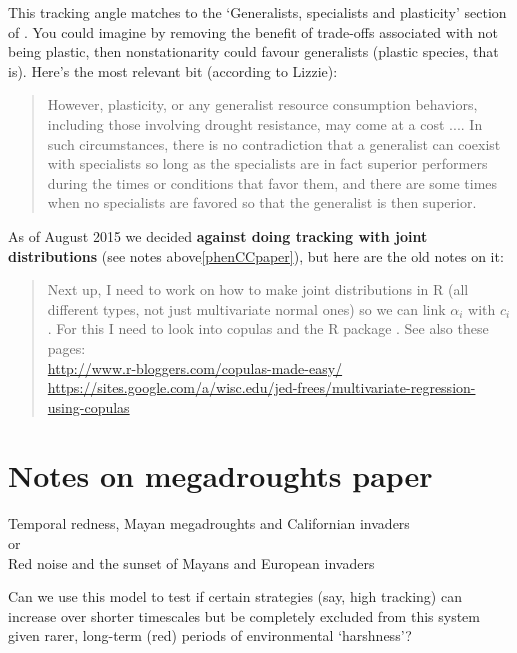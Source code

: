 \documentclass[11pt,a4paper,oneside]{article}
\begin{document}
\noindent This tracking angle matches to the `Generalists, specialists and plasticity' section of \citet{Chesson:2004eo}. You could imagine by removing the benefit of trade-offs associated with not being plastic, then nonstationarity could favour generalists (plastic species, that is). Here's the most relevant bit (according to Lizzie):
\begin{quote}
However, plasticity, or any generalist resource consumption
behaviors, including those involving drought resistance,
may come at a cost .... In such circumstances, there is no
contradiction that a generalist can coexist with specialists
so long as the specialists are in fact superior performers
during the times or conditions that favor them, and there 
are some times when no specialists are favored so that the
generalist is then superior.
\end{quote}

As of August 2015 we decided {\bf against doing tracking with joint distributions} (see notes above\ref{phenCCpaper}), but here are the old notes on it:
\begin{quote}
Next up, I need to work on how to make joint distributions in R (all different types, not just multivariate normal ones) so we can link \(\alpha_{i}\) with \(c_{i}\). For this I need to look into copulas and the R package \verb@copula@. See also these pages:\\
\url{http://www.r-bloggers.com/copulas-made-easy/}\\
\url{https://sites.google.com/a/wisc.edu/jed-frees/multivariate-regression-using-copulas}
\end{quote}


\newpage
\section{Notes on megadroughts paper}\label{mayannotes}
\begin{center}
{\Large Temporal redness, Mayan megadroughts and Californian invaders\\ or\\ Red noise and the sunset of Mayans and European invaders}
\end{center}

\noindent Can we use this model to test if certain strategies (say, high tracking) can increase over shorter timescales but be completely excluded from this system given rarer, long-term (red) periods of environmental `harshness'?\\
\end{document}
